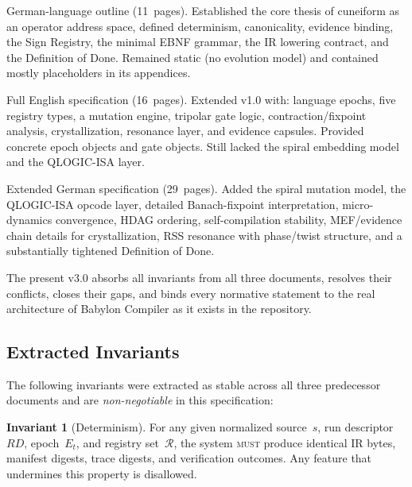 \documentclass[11pt,a4paper,twoside]{article}
\theoremstyle{definition}
\newtheorem{invariant}{Invariant}[section]
\theoremstyle{remark}
\newcommand{\must}{\textsc{must}}
\begin{document}
\begin{description}[style=nextline,leftmargin=2.5cm]
  \item[v1.0 (COL\_de)] German-language outline (11~pages). Established the core thesis of cuneiform as an operator address space, defined determinism, canonicality, evidence binding, the Sign Registry, the minimal EBNF grammar, the IR lowering contract, and the Definition of Done. Remained static (no evolution model) and contained mostly placeholders in its appendices.
  \item[v2.0 (English)] Full English specification (16~pages). Extended v1.0 with: language epochs, five registry types, a mutation engine, tripolar gate logic, contraction/fixpoint analysis, crystallization, resonance layer, and evidence capsules. Provided concrete epoch objects and gate objects. Still lacked the spiral embedding model and the QLOGIC-ISA layer.
  \item[v2.1 (Keilschrift++)] Extended German specification (29~pages). Added the spiral mutation model, the QLOGIC-ISA opcode layer, detailed Banach-fixpoint interpretation, micro-dynamics convergence, HDAG ordering, self-compilation stability, MEF/evidence chain details for crystallization, RSS resonance with phase/twist structure, and a substantially tightened Definition of Done.
\end{description}

The present v3.0 absorbs all invariants from all three documents, resolves their conflicts, closes their gaps, and binds every normative statement to the real architecture of Babylon Compiler as it exists in the repository.


\subsection{Extracted Invariants}
\label{sec:invariants}

The following invariants were extracted as stable across all three predecessor documents and are \emph{non-negotiable} in this specification:

\begin{invariant}[Determinism]
\label{inv:determinism}
For any given normalized source~$s$, run descriptor~$\mathit{RD}$, epoch~$E_t$, and registry set~$\mathcal{R}$, the system \must{} produce identical IR bytes, manifest digests, trace digests, and verification outcomes. Any feature that undermines this property is disallowed.
\end{invariant}
\end{document}
